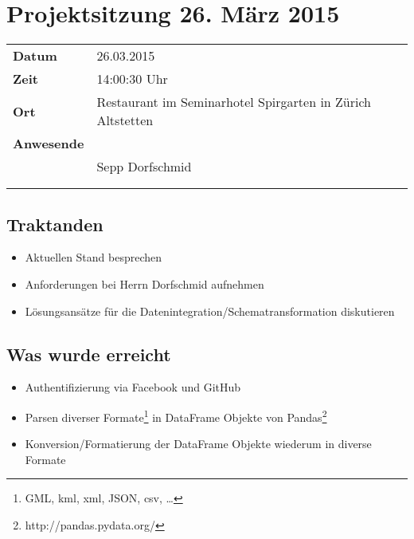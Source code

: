 \documentclass[class=scrbook,crop=false]{standalone}
\begin{document}
	
	\section{Projektsitzung 26. März 2015}
	
	\begin{tabular}{ll}
		\textbf{Datum} & 26.03.2015 \\
		\textbf{Zeit} & 14:00\textendash15:30 Uhr \\
		\textbf{Ort} & Restaurant im Seminarhotel Spirgarten in Zürich Altstetten \\
		\textbf{Anwesende} & \proff \\ & Sepp Dorfschmid\footnotemark{} \\ & \rlif \\ & \fscf
	\end{tabular}
	
	\subsection*{Traktanden}
	\begin{itemize}
		\item Aktuellen Stand besprechen
		\item Anforderungen bei Herrn Dorfschmid aufnehmen
		\item Lösungsansätze für die Datenintegration/Schematransformation diskutieren
	\end{itemize}
	
	\subsection*{Was wurde erreicht}
	\begin{itemize}
		\item Authentifizierung via Facebook und GitHub
		\item Parsen diverser Formate\footnote{GML, \acs{kml}, \acs{xml}, JSON, \acs{csv}, \dots} in DataFrame Objekte von Pandas\footnote{http://pandas.pydata.org/}
		\item Konversion/Formatierung der DataFrame Objekte wiederum in diverse Formate
	\end{itemize}
	
\end{document}
